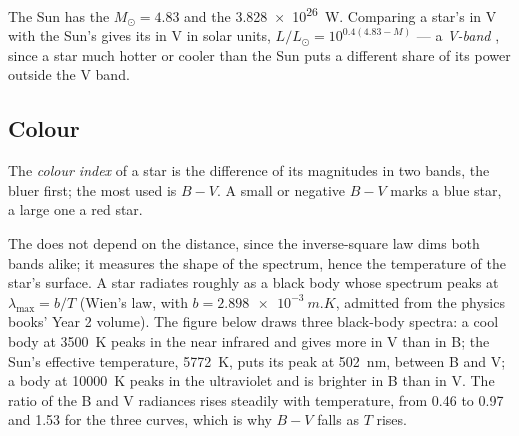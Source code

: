 The Sun has the  $M_\odot = 4.83$ and the 
\qty{3.828e26}{W}. Comparing a star's  in V with the
Sun's gives its  in V in solar units,
$L/L_\odot = 10^{0.4(4.83 - M)}$ --- a \emph{V-band} , since a
star much hotter or cooler than the Sun puts a different share of its power
outside the V band.

\subsection*{Colour}

\begin{definition}\label{def:b1:observing-the-sky:colour-index}
The \emph{colour index} of a star is the difference of
its magnitudes in two bands, the bluer first; the most used is $B - V$. A
small or negative $B - V$ marks a blue star, a large one a red star.
\end{definition}

The  does not depend on the distance, since the inverse-square
law dims both bands alike; it measures the shape of the spectrum, hence the
temperature of the star's surface. A star radiates roughly as a black body
whose spectrum peaks at $\lambda_\mathrm{max} = b/T$ (Wien's law, with
$b = \qty{2.898e-3}{m.K}$, admitted from the physics books' Year 2 volume).
The figure below draws three black-body spectra: a
cool body at \qty{3500}{K} peaks in the near infrared and gives more  in V
than in B; the Sun's effective temperature, \qty{5772}{K}, puts its peak at
\qty{502}{nm}, between B and V; a body at \qty{10000}{K} peaks in the
ultraviolet and is brighter in B than in V. The ratio of the B and V
radiances rises steadily with temperature, from \num{0.46} to \num{0.97} and
\num{1.53} for the three curves, which is why $B - V$ falls as $T$ rises.

